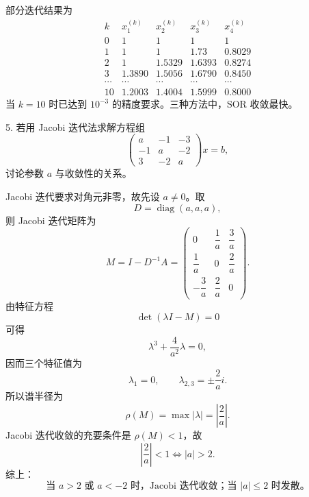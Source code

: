 \documentclass[11pt, a4paper]{ctexart}
\begin{document}
\begin{solution}
    部分迭代结果为
    \[
        \renewcommand{\arraystretch}{1.15}
        \begin{array}{c|cccc}
            k & x_1^{(k)} & x_2^{(k)} & x_3^{(k)} & x_4^{(k)} \\ \hline
            0  & 1      & 1      & 1      & 1 \\
            1  & 1      & 1      & 1.73   & 0.8029 \\
            2  & 1      & 1.5329 & 1.6393 & 0.8274 \\
            3  & 1.3890 & 1.5056 & 1.6790 & 0.8450 \\
            \cdots & \cdots & \cdots & \cdots & \cdots \\
            10 & 1.2003 & 1.4004 & 1.5999 & 0.8000
        \end{array}
    \]
    当 $k = 10$ 时已达到 $10^{-3}$ 的精度要求。三种方法中，SOR 收敛最快。
\end{solution}


\begin{problem}{5. 若用 Jacobi 迭代法求解方程组}
    \[
        \begin{pmatrix}
            a & -1 & -3 \\
            -1 & a & -2 \\
            3 & -2 & a
        \end{pmatrix}
        x = b,
    \]
    讨论参数 $a$ 与收敛性的关系。
\end{problem}

\begin{solution}
    Jacobi 迭代要求对角元非零，故先设 $a \ne 0$。取
    \[
        D = \operatorname{diag}(a,a,a),
    \]
    则 Jacobi 迭代矩阵为
    \[
        M = I - D^{-1}A
        =
        \begin{pmatrix}
            0 & \dfrac{1}{a} & \dfrac{3}{a} \\
            \dfrac{1}{a} & 0 & \dfrac{2}{a} \\
            -\dfrac{3}{a} & \dfrac{2}{a} & 0
        \end{pmatrix}.
    \]
    由特征方程
    \[
        \det(\lambda I - M) = 0
    \]
    可得
    \[
        \lambda^3 + \frac{4}{a^2}\lambda = 0,
    \]
    因而三个特征值为
    \[
        \lambda_1 = 0,\qquad
        \lambda_{2,3} = \pm \frac{2}{a} i.
    \]
    所以谱半径为
    \[
        \rho(M) = \max |\lambda| = \left|\frac{2}{a}\right|.
    \]
    Jacobi 迭代收敛的充要条件是 $\rho(M) < 1$，故
    \[
        \left|\frac{2}{a}\right| < 1
        \iff |a| > 2.
    \]
    综上：
    \[
        \boxed{\text{当 } a > 2 \text{ 或 } a < -2 \text{ 时，Jacobi 迭代收敛；当 } |a| \le 2 \text{ 时发散。}}
    \]
\end{solution}
\end{document}
